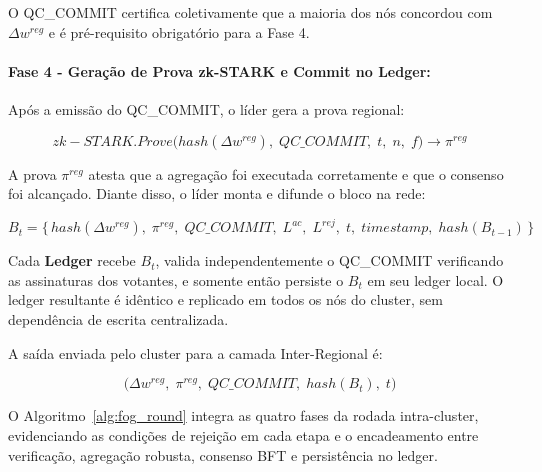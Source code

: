 \documentclass[12pt]{article}
\begin{document}
O QC\_COMMIT certifica coletivamente que a maioria dos nós concordou com $\Delta w^{{reg}}$ e é pré-requisito obrigatório para a Fase 4.

\paragraph{Fase 4 - Geração de Prova zk-STARK e Commit no Ledger:} Após a emissão do QC\_COMMIT, o líder gera a prova regional: 

\[
{zk-STARK.Prove}\bigl({hash}(\Delta w^{{reg}}),\; {QC\_COMMIT},\; t,\; n,\; f\bigr) \rightarrow \pi^{{reg}}
\]

A prova $\pi^{{reg}}$ atesta que a agregação foi executada corretamente e que o consenso foi alcançado. Diante disso, o líder monta e difunde o bloco na rede:

\[
B_t = \bigl\{\,{hash}(\Delta w^{{reg}}),\; \pi^{{reg}},\; {QC\_COMMIT},\; L^{{ac}},\; L^{{rej}},\; t,\; {timestamp},\; {hash}(B_{t-1})\,\bigr\}
\]

Cada \textbf{Ledger} recebe $B_t$, valida independentemente o QC\_COMMIT verificando as assinaturas dos votantes, e somente então persiste o $B_t$ em seu ledger local. O ledger resultante é idêntico e replicado em todos os nós do cluster, sem dependência de escrita centralizada.

A saída enviada pelo cluster para a camada Inter-Regional é:

\[
\bigl(\Delta w^{{reg}},\; \pi^{{reg}},\; {QC\_COMMIT},\; {hash}(B_t),\; t\bigr)
\]

O Algoritmo~\ref{alg:fog_round} integra as quatro fases da rodada intra-cluster, evidenciando as condições de rejeição em cada etapa e o encadeamento entre verificação, agregação robusta, consenso BFT
e persistência no ledger.
\end{document}
